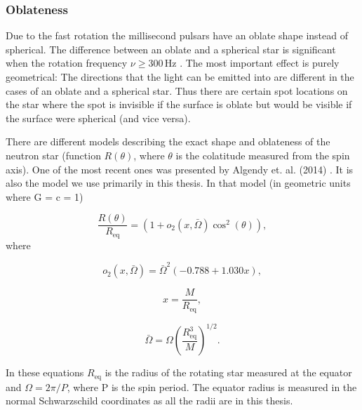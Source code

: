 \documentclass{wihuri}
\begin{document}
\subsubsection{Oblateness}

Due to the fast rotation the millisecond pulsars have an oblate shape instead of spherical. The difference between an oblate and a spherical star is significant when the rotation frequency $\nu \ge 300 \, \mathrm{Hz}$ \cite{cadeau}%
. The most important effect is purely geometrical: The directions that the light can be emitted into are different in the cases of an oblate and a spherical star. Thus there are certain spot locations on the star where the spot is invisible if the surface is oblate but would be visible if the surface were spherical (and vice versa).


There are different models describing the exact shape and oblateness of the neutron star (function $R(\theta)$, where $\theta$ is the colatitude measured from the spin axis).
One of the most recent ones was presented by Algendy et. al. (2014) \cite{algendy}. 
It is also the model we use primarily in this thesis. In that model (in geometric units
where G = c = 1)

\begin{equation}
\label{rtheta2}
\frac{R(\theta)}{R_{\mathrm{eq}}} = (1 + o_{2}(x,\bar{\Omega})\cos^{2}(\theta)),
\end{equation}
where


\begin{equation}
\label{otwo}
o_{2}(x,\bar{\Omega}) = \bar{\Omega}^{2}(-0.788+1.030x),
\end{equation}


\begin{equation}
\label{rtheta2x}
x = \frac{M}{R_{\mathrm{eq}}},
\end{equation}


\begin{equation}
\label{rtheta2omega}
\bar{\Omega} = \Omega (\frac{R_{\mathrm{eq}}^{3}}{M})^{1/2}.
\end{equation}


In these equations $R_{\mathrm{eq}}$ is the radius of the rotating star measured at the equator and $\Omega = 2\pi/P$, where P is the spin period. The equator radius is measured in the normal Schwarzschild coordinates as all the radii are in this thesis.
\end{document}
